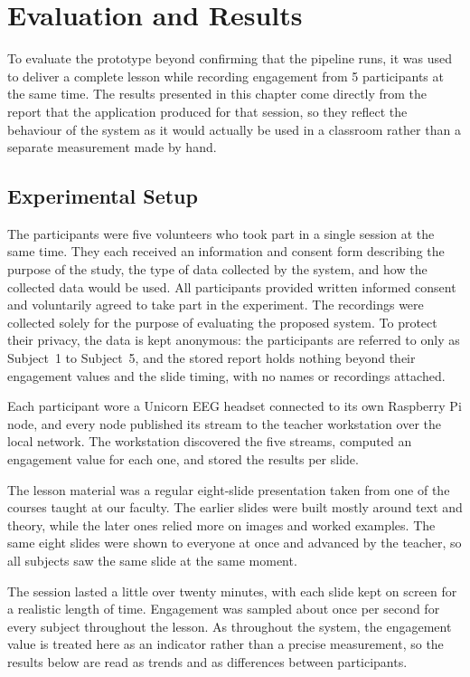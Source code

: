 \chapter{Evaluation and Results}\label{cap:evalnress}
To evaluate the prototype beyond confirming that the pipeline runs, it was used to deliver a complete lesson while recording engagement from 5 participants at the same time. The results presented in this chapter come directly from the report that the application produced for that session, so they reflect the behaviour of the system as it would actually be used in a classroom rather than a separate measurement made by hand.

\section{Experimental Setup}\label{sect:expset}
The participants were five volunteers who took part in a single session at the same time. They each received an information and consent form describing the purpose of the study, the type of data collected by the system, and how the collected data would be used. All participants provided written informed consent and voluntarily agreed to take part in the experiment. The recordings were collected solely for the purpose of evaluating the proposed system. To protect their privacy, the data is kept anonymous: the participants are referred to only as Subject~1 to Subject~5, and the stored report holds nothing beyond their engagement values and the slide timing, with no names or recordings attached.

Each participant wore a Unicorn EEG headset connected to its own Raspberry Pi node, and every node published its stream to the teacher workstation over the local network. The workstation discovered the five streams, computed an engagement value for each one, and stored the results per slide.

The lesson material was a regular eight-slide presentation taken from one of the courses taught at our faculty. The earlier slides were built mostly around text and theory, while the later ones relied more on images and worked examples. The same eight slides were shown to everyone at once and advanced by the teacher, so all subjects saw the same slide at the same moment.

The session lasted a little over twenty minutes, with each slide kept on screen for a realistic length of time. Engagement was sampled about once per second for every subject throughout the lesson. As throughout the system, the engagement value is treated here as an indicator rather than a precise measurement, so the results below are read as trends and as differences between participants.

